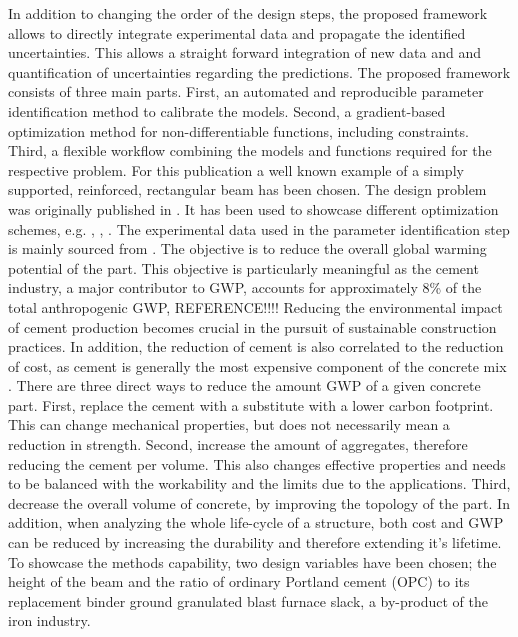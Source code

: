 In addition to changing the order of the design steps, the proposed framework allows to directly integrate experimental data and propagate the identified uncertainties.
This allows a straight forward integration of new data and and quantification of uncertainties regarding the predictions.
The proposed framework consists of three main parts.
First, an automated and reproducible parameter identification method to calibrate the models.
Second, a gradient-based optimization method for non-differentiable functions, including constraints.
Third, a flexible workflow combining the models and functions required for the respective problem. 
For this publication a well known example of a simply supported, reinforced, rectangular beam  has been chosen.
The design problem was originally published in \cite{everard1966reinforced}.
It has been used to showcase different optimization schemes, e.g. \cite{Chakrabarty_1992}, \cite{Coello_1997}, \cite{Pierott_2021}.
The experimental data used in the parameter identification step is mainly sourced from \cite{gruyaert2011}.
The objective is to reduce the overall global warming potential of the part.
This objective is particularly meaningful as the cement industry, a major contributor to GWP, accounts for approximately 8\% of the total anthropogenic GWP, REFERENCE!!!!
Reducing the environmental impact of cement production becomes crucial in the pursuit of sustainable construction practices.
In addition, the reduction of cement is also correlated to the reduction of cost, as cement is generally the most expensive component of the concrete mix \cite{Paya_Zaforteza_2009}.
There are three direct ways to reduce the amount GWP of a given concrete part.
First, replace the cement with a substitute with a lower carbon footprint.
This can change mechanical properties, but does not necessarily mean a reduction in strength.
Second, increase the amount of aggregates, therefore reducing the cement per volume.
This also changes effective properties and needs to be balanced with the workability and the limits due to the applications.
Third, decrease the overall volume of concrete, by improving the topology of the part.
In addition, when analyzing the whole life-cycle of a structure, both cost and GWP can be reduced by increasing the durability and therefore extending it's lifetime.
To showcase the methods capability, two design variables have been chosen; the height of the beam and the ratio of ordinary Portland cement (OPC) to its replacement binder ground granulated blast furnace slack, a by-product of the iron industry.\\
